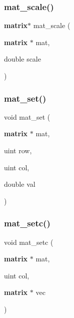 \mbox{\label{mat_lib_8h_a15943d16ca468cfe9691beaa4afd1782}} 
\subsubsection{mat\+\_\+scale()}
{\footnotesize\ttfamily \textbf{ matrix}$\ast$ mat\+\_\+scale (\begin{DoxyParamCaption}\item[{\textbf{ matrix} $\ast$}]{mat,  }\item[{double}]{scale }\end{DoxyParamCaption})}

\mbox{\label{mat_lib_8h_a41dc833c40ab1b7d74262b1030bde4f8}} 
\subsubsection{mat\+\_\+set()}
{\footnotesize\ttfamily void mat\+\_\+set (\begin{DoxyParamCaption}\item[{\textbf{ matrix} $\ast$}]{mat,  }\item[{uint}]{row,  }\item[{uint}]{col,  }\item[{double}]{val }\end{DoxyParamCaption})}

\mbox{\label{mat_lib_8h_aff47162f5fa279af2f4294261116ebb7}} 
\subsubsection{mat\+\_\+setc()}
{\footnotesize\ttfamily void mat\+\_\+setc (\begin{DoxyParamCaption}\item[{\textbf{ matrix} $\ast$}]{mat,  }\item[{uint}]{col,  }\item[{\textbf{ matrix} $\ast$}]{vec }\end{DoxyParamCaption})}

\mbox{\label{mat_lib_8h_a59e00090b26ebb2b4ba2f9de99d51e07}} 
